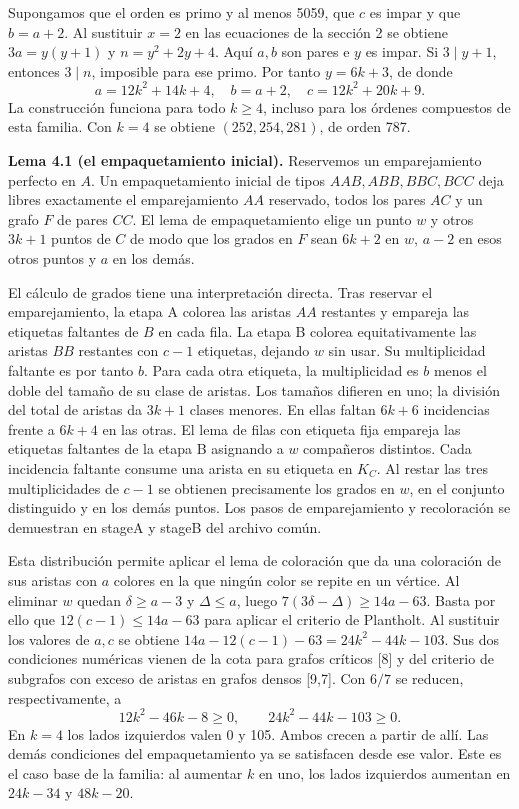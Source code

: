 \documentclass[spanish,11pt,a4paper]{article}
\begin{document}
Supongamos que el orden es primo y al menos 5059, que \(c\) es impar y que \(b=a+2\). Al sustituir \(x=2\) en las ecuaciones de la sección 2 se obtiene \(3a=y(y+1)\) y \(n=y^2+2y+4\). Aquí \(a,b\) son pares e \(y\) es impar. Si \(3\mid y+1\), entonces \(3\mid n\), imposible para ese primo. Por tanto \(y=6k+3\), de donde \[a=12k^2+14k+4,\quad b=a+2,\quad c=12k^2+20k+9.\] La construcción funciona para todo \(k\ge4\), incluso para los órdenes compuestos de esta familia. Con \(k=4\) se obtiene \((252,254,281)\), de orden 787.

\textbf{Lema 4.1 (el empaquetamiento inicial).} Reservemos un emparejamiento perfecto en \(A\). Un empaquetamiento inicial de tipos \(AAB,ABB,BBC,BCC\) deja libres exactamente el emparejamiento \(AA\) reservado, todos los pares \(AC\) y un grafo \(F\) de pares \(CC\). El lema de empaquetamiento elige un punto \(w\) y otros \(3k+1\) puntos de \(C\) de modo que los grados en \(F\) sean \(6k+2\) en \(w\), \(a-2\) en esos otros puntos y \(a\) en los demás.

El cálculo de grados tiene una interpretación directa. Tras reservar el emparejamiento, la etapa A colorea las aristas \(AA\) restantes y empareja las etiquetas faltantes de \(B\) en cada fila. La etapa B colorea equitativamente las aristas \(BB\) restantes con \(c-1\) etiquetas, dejando \(w\) sin usar. Su multiplicidad faltante es por tanto \(b\). Para cada otra etiqueta, la multiplicidad es \(b\) menos el doble del tamaño de su clase de aristas. Los tamaños difieren en uno; la división del total de aristas da \(3k+1\) clases menores. En ellas faltan \(6k+6\) incidencias frente a \(6k+4\) en las otras. El lema de filas con etiqueta fija empareja las etiquetas faltantes de la etapa B asignando a \(w\) compañeros distintos. Cada incidencia faltante consume una arista en su etiqueta en \(K_C\). Al restar las tres multiplicidades de \(c-1\) se obtienen precisamente los grados en \(w\), en el conjunto distinguido y en los demás puntos. Los pasos de emparejamiento y recoloración se demuestran en stageA y stageB del archivo común.

Esta distribución permite aplicar el lema de coloración que da una coloración de sus aristas con \(a\) colores en la que ningún color se repite en un vértice. Al eliminar \(w\) quedan \(\delta\ge a-3\) y \(\Delta\le a\), luego \(7(3\delta-\Delta)\ge14a-63\). Basta por ello que \(12(c-1)\le14a-63\) para aplicar el criterio de Plantholt. Al sustituir los valores de \(a,c\) se obtiene \(14a-12(c-1)-63=24k^2-44k-103\). Sus dos condiciones numéricas vienen de la cota para grafos críticos {[}8{]} y del criterio de subgrafos con exceso de aristas en grafos densos {[}9,7{]}. Con \(6/7\) se reducen, respectivamente, a \[12k^2-46k-8\ge0,\qquad 24k^2-44k-103\ge0.\] En \(k=4\) los lados izquierdos valen 0 y 105. Ambos crecen a partir de allí. Las demás condiciones del empaquetamiento ya se satisfacen desde ese valor. Este es el caso base de la familia: al aumentar \(k\) en uno, los lados izquierdos aumentan en \(24k-34\) y \(48k-20\).
\end{document}
